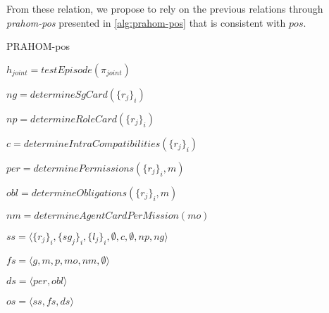 \documentclass[runningheads]{llncs}
\newcounter{relation}
\begin{document}
From these relation, we propose to rely on the previous relations through \emph{prahom-pos} presented in \autoref{alg:prahom-pos} that is consistent with $pos$.


\begin{algorithm}[hbt!]
    \caption{PRAHOM-pos}\label{alg:prahom-pos}

    $h_{joint} = testEpisode(\pi_{joint})$


    $ng = determineSgCard(\{r_j\}_i)$

    $np = determineRoleCard(\{r_j\}_i)$

    $c = determineIntraCompatibilities(\{r_j\}_i)$

    $per = determinePermissions(\{r_j\}_i, m)$

    $obl = determineObligations(\{r_j\}_i, m)$

    $nm = determineAgentCardPerMission(mo)$

    $ss = \langle \{r_j\}_i, \{sg_j\}_i, \{l_j\}_i, \emptyset, c, \emptyset, np, ng \rangle$

    $fs = \langle {g, m, p, mo, nm}, \emptyset \rangle$

    $ds = \langle per, obl \rangle$

    $os = \langle ss, fs, ds \rangle$

\end{algorithm}
\end{document}
